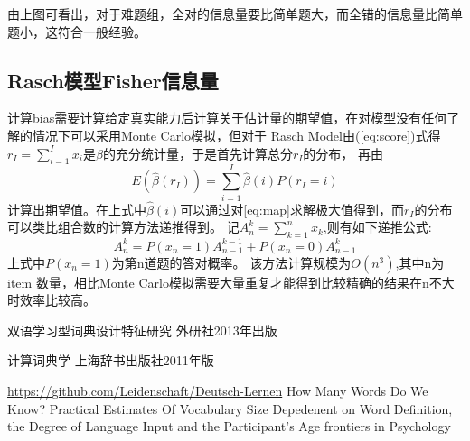 \documentclass[12pt]{article}
\begin{document}
由上图可看出，对于难题组，全对的信息量要比简单题大，而全错的信息量比简单题小，这符合一般经验。
\subsection{Rasch模型Fisher信息量}\label{A5}
计算bias需要计算给定真实能力后计算关于估计量的期望值，在对模型没有任何了解的情况下可以采用Monte Carlo模拟，但对于
Rasch Model由(\ref{eq:score})式得$r_I=\displaystyle\sum_{i=1}^I x_i$是$\beta$的充分统计量，于是首先计算总分$r_I$的分布，
再由
\begin{equation}
E(\hat{\beta}(r_I))=\sum_{i=1}^I \hat{\beta}(i)P(r_I=i)
\end{equation}
计算出期望值。在上式中$\hat{\beta}(i)$可以通过对\ref{eq:map}求解极大值得到，而$r_I$的分布可以类比组合数的计算方法递推得到。
记$A_n^k=\displaystyle\sum_{k=1}^n x_k$,则有如下递推公式:
\begin{equation}
A_n^k=P(x_n=1)A_{n-1}^{k-1}+P(x_n=0)A_{n-1}^k
\end{equation}
上式中$P(x_n=1)$为第n道题的答对概率。
该方法计算规模为$O(n^3)$,其中n为item 数量，相比Monte Carlo模拟需要大量重复才能得到比较精确的结果在n不大时效率比较高。
\begin{thebibliography}{}
双语学习型词典设计特征研究 外研社2013年出版

 计算词典学 上海辞书出版社2011年版

 \url{https://github.com/Leidenschaft/Deutsch-Lernen}
 How Many Words Do We Know? Practical Estimates Of
Vocabulary Size Depedenent on Word Definition, the Degree of Language Input and the Participant's Age		frontiers in Psychology
\end{thebibliography}
\end{document}
